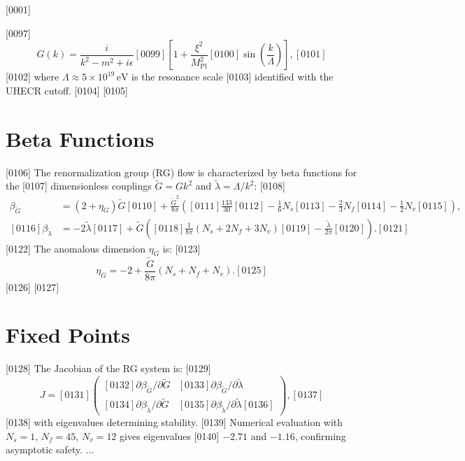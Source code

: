[0001] \documentclass[12pt]{report}
[0002] \usepackage[utf8]{inputenc}
\begin{document}
[0097] \begin{equation}
[0098] G(k) = \frac{i}{k^2 - m^2 + i\epsilon}
[0099] \left[ 1 + \frac{\xi^2}{M_{\text{Pl}}^2}
[0100] \sin\left(\frac{k}{\Lambda}\right) \right],
[0101] \end{equation}
[0102] where $\Lambda \approx 5 \times 10^{19} \, \text{eV}$ is the resonance scale
[0103] identified with the UHECR cutoff.
[0104] 
[0105] \section{Beta Functions}
[0106] The renormalization group (RG) flow is characterized by beta functions for the
[0107] dimensionless couplings $\tilde{G} = G k^2$ and $\tilde{\lambda} = \Lambda/k^2$:
[0108] \begin{align}
[0109] \beta_{\tilde{G}} &= (2 + \eta_G) \tilde{G}
[0110] + \frac{\tilde{G}^2}{8\pi} \left(
[0111] \frac{133}{30}
[0112] - \frac{1}{6} N_s
[0113] - \frac{2}{3} N_f
[0114] - \frac{1}{2} N_v
[0115] \right), \\
[0116] \beta_{\tilde{\lambda}} &= -2 \tilde{\lambda}
[0117] + \tilde{G} \left(
[0118] \frac{1}{8\pi} (N_s + 2 N_f + 3 N_v)
[0119] - \frac{\tilde{\lambda}}{2\pi}
[0120] \right).
[0121] \end{align}
[0122] The anomalous dimension $\eta_G$ is:
[0123] \begin{equation}
[0124] \eta_G = -2 + \frac{\tilde{G}}{8\pi} (N_s + N_f + N_v).
[0125] \end{equation}
[0126] 
[0127] \section{Fixed Points}
[0128] The Jacobian of the RG system is:
[0129] \begin{equation}
[0130] J =
[0131] \begin{pmatrix}
[0132] \partial \beta_{\tilde{G}} / \partial \tilde{G} &
[0133] \partial \beta_{\tilde{G}} / \partial \tilde{\lambda} \\
[0134] \partial \beta_{\tilde{\lambda}} / \partial \tilde{G} &
[0135] \partial \beta_{\tilde{\lambda}} / \partial \tilde{\lambda}
[0136] \end{pmatrix},
[0137] \end{equation}
[0138] with eigenvalues determining stability.
[0139] Numerical evaluation with $N_s=1$, $N_f=45$, $N_v=12$ gives eigenvalues
[0140] $-2.71$ and $-1.16$, confirming asymptotic safety.
...
\end{document}
